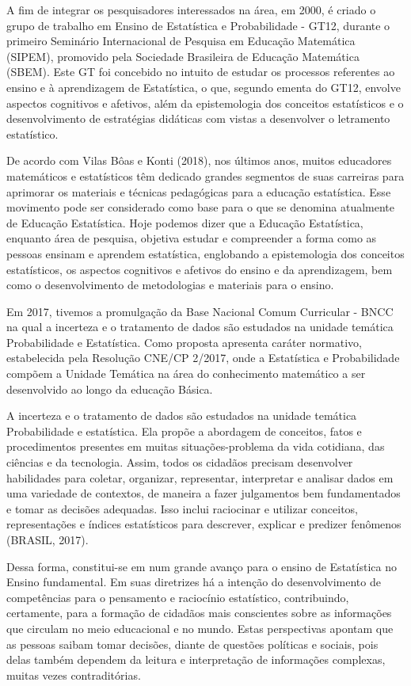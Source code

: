 \documentclass[
  letterpaper,
  DIV=11,
  numbers=noendperiod]{scrreprt}
\begin{document}
A fim de integrar os pesquisadores interessados na área, em 2000, é
criado o grupo de trabalho em Ensino de Estatística e Probabilidade -
GT12, durante o primeiro Seminário Internacional de Pesquisa em Educação
Matemática (SIPEM), promovido pela Sociedade Brasileira de Educação
Matemática (SBEM). Este GT foi concebido no intuito de estudar os
processos referentes ao ensino e à aprendizagem de Estatística, o que,
segundo ementa do GT12, envolve aspectos cognitivos e afetivos, além da
epistemologia dos conceitos estatísticos e o desenvolvimento de
estratégias didáticas com vistas a desenvolver o letramento estatístico.

De acordo com Vilas Bôas e Konti (2018), nos últimos anos, muitos
educadores matemáticos e estatísticos têm dedicado grandes segmentos de
suas carreiras para aprimorar os materiais e técnicas pedagógicas para a
educação estatística. Esse movimento pode ser considerado como base para
o que se denomina atualmente de Educação Estatística. Hoje podemos dizer
que a Educação Estatística, enquanto área de pesquisa, objetiva estudar
e compreender a forma como as pessoas ensinam e aprendem estatística,
englobando a epistemologia dos conceitos estatísticos, os aspectos
cognitivos e afetivos do ensino e da aprendizagem, bem como o
desenvolvimento de metodologias e materiais para o ensino.

Em 2017, tivemos a promulgação da Base Nacional Comum Curricular - BNCC
na qual a incerteza e o tratamento de dados são estudados na unidade
temática Probabilidade e Estatística. Como proposta apresenta caráter
normativo, estabelecida pela Resolução CNE/CP 2/2017, onde a Estatística
e Probabilidade compõem a Unidade Temática na área do conhecimento
matemático a ser desenvolvido ao longo da educação Básica.

A incerteza e o tratamento de dados são estudados na unidade temática
Probabilidade e estatística. Ela propõe a abordagem de conceitos, fatos
e procedimentos presentes em muitas situações-problema da vida
cotidiana, das ciências e da tecnologia. Assim, todos os cidadãos
precisam desenvolver habilidades para coletar, organizar, representar,
interpretar e analisar dados em uma variedade de contextos, de maneira a
fazer julgamentos bem fundamentados e tomar as decisões adequadas. Isso
inclui raciocinar e utilizar conceitos, representações e índices
estatísticos para descrever, explicar e predizer fenômenos (BRASIL,
2017).

Dessa forma, constitui-se em num grande avanço para o ensino de
Estatística no Ensino fundamental. Em suas diretrizes há a intenção do
desenvolvimento de competências para o pensamento e raciocínio
estatístico, contribuindo, certamente, para a formação de cidadãos mais
conscientes sobre as informações que circulam no meio educacional e no
mundo. Estas perspectivas apontam que as pessoas saibam tomar decisões,
diante de questões políticas e sociais, pois delas também dependem da
leitura e interpretação de informações complexas, muitas vezes
contraditórias.
\end{document}
